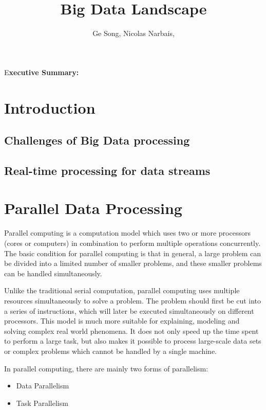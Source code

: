 \documentclass[	DIV=calc,%
							paper=a4,%
							fontsize=11pt,%
							twocolumn]{scrartcl}	 					%
\title{Big Data Landscape}					%
\author{Ge Song, Nicolas Narbais, }											%
\date{}																				%
\newcommand{\initial}[1]{%
     \lettrine[lines=3,lhang=0.3,nindent=0em]{
     				\color{DarkBlue}
     				{\textsf{#1}}}{}}
\begin{document}
\maketitle
\thispagestyle{fancy} 			%
\initial{E}\textbf{xecutive Summary: }


\section*{\color{DarkOrange}Introduction}

\subsection*{Challenges of Big Data processing}\label{sec: challenges}

\subsection*{Real-time processing for data streams}
 

\section*{\color{DarkOrange}Parallel Data Processing}

\initial{P}arallel computing is a computation model which uses two or more processors (cores or computers) in combination to perform multiple operations concurrently. The basic condition for parallel computing is that in general, a large problem can be divided into a limited number of smaller problems, and these smaller problems can be handled simultaneously.
					
Unlike the traditional serial computation, parallel computing uses multiple resources simultaneously to solve a problem. The problem should first be cut into a series of instructions, which will later be executed simultaneously on different processors. This model is much more suitable for explaining, modeling and solving complex real world phenomena. It does not only speed up the time spent to perform a large task, but also makes it possible to process large-scale data sets or complex problems which cannot be handled by a single machine.
					
In parallel computing, there are mainly two forms of parallelism: 
\begin{itemize}
\item Data Parallelism

\item Task Parallelism

\end{itemize}
					
\end{document}
